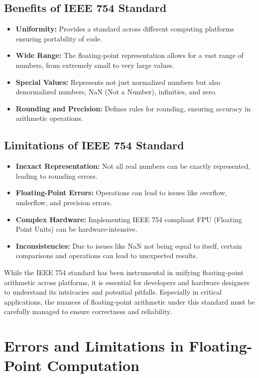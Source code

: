 \subsection{Benefits of IEEE 754 Standard}

\begin{itemize}
	\item \textbf{Uniformity:} Provides a standard across different computing platforms ensuring portability of code.
	\item \textbf{Wide Range:} The floating-point representation allows for a vast range of numbers, from extremely small to very large values.
	\item \textbf{Special Values:} Represents not just normalized numbers but also denormalized numbers, NaN (Not a Number), infinities, and zero.
	\item \textbf{Rounding and Precision:} Defines rules for rounding, ensuring accuracy in arithmetic operations.
\end{itemize}

\subsection{Limitations of IEEE 754 Standard}

\begin{itemize}
	\item \textbf{Inexact Representation:} Not all real numbers can be exactly represented, leading to rounding errors.
	\item \textbf{Floating-Point Errors:} Operations can lead to issues like overflow, underflow, and precision errors.
	\item \textbf{Complex Hardware:} Implementing IEEE 754 compliant FPU (Floating Point Units) can be hardware-intensive.
	\item \textbf{Inconsistencies:} Due to issues like NaN not being equal to itself, certain comparisons and operations can lead to unexpected results.
\end{itemize}

While the IEEE 754 standard has been instrumental in unifying floating-point arithmetic across platforms, it is essential for developers and hardware designers to understand its intricacies and potential pitfalls. Especially in critical applications, the nuances of floating-point arithmetic under this standard must be carefully managed to ensure correctness and reliability.

\section{Errors and Limitations in Floating-Point Computation}

